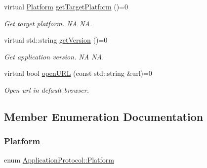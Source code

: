 \begin{DoxyCompactItemize}
\mbox{\label{classApplicationProtocol_a20931b60a1fc13a6dfc2ef322ecb5ce7}} 
virtual \hyperlink{classApplicationProtocol_aff3819b9b879107dc9c207d0e7ae36d1}{Platform} \hyperlink{classApplicationProtocol_a20931b60a1fc13a6dfc2ef322ecb5ce7}{get\+Target\+Platform} ()=0
\begin{DoxyCompactList}\small\item\em Get target platform.  NA  NA. \end{DoxyCompactList}\item 
\mbox{\label{classApplicationProtocol_aad2851a7176c571a79cf068d72543012}} 
virtual std\+::string \hyperlink{classApplicationProtocol_aad2851a7176c571a79cf068d72543012}{get\+Version} ()=0
\begin{DoxyCompactList}\small\item\em Get application version.  NA  NA. \end{DoxyCompactList}\item 
virtual bool \hyperlink{classApplicationProtocol_a152a977b301a90253ec5a6533b2e8e04}{open\+U\+RL} (const std\+::string \&url)=0
\begin{DoxyCompactList}\small\item\em Open url in default browser. \end{DoxyCompactList}\end{DoxyCompactItemize}


\subsection{Member Enumeration Documentation}
\mbox{\label{classApplicationProtocol_aff3819b9b879107dc9c207d0e7ae36d1}} 
\subsubsection{\texorpdfstring{Platform}{Platform}\hspace{0.1cm}{\footnotesize\ttfamily [1/2]}}
{\footnotesize\ttfamily enum \hyperlink{classApplicationProtocol_aff3819b9b879107dc9c207d0e7ae36d1}{Application\+Protocol\+::\+Platform}\hspace{0.3cm}{\ttfamily [strong]}}

